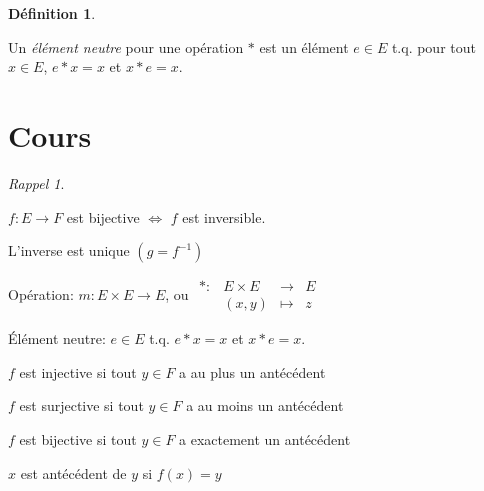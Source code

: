 \documentclass{report}
\newcounter{cours}
\newcommand*{\cours}{\section*{Cours \thecours}\stepcounter{cours}}
\theoremstyle{definition}
\newtheorem*{defin}{D\'efinition}
\theoremstyle{remark}
\newtheorem*{rappel}{Rappel}
\begin{document}
	\begin{defin}~

		Un \emph{\'el\'ement neutre} pour une op\'eration $*$ est un \'el\'ement $e \in E$ t.q. pour tout $x \in E$, $e*x=x$ et $x*e=x$.
	\end{defin}

	\cours
	\begin{rappel}
		~

		\begin{ulist}[noitemsep]
			\item $f:E \to F$ est bijective $\Leftrightarrow$ $f$ est inversible.
			\item L'inverse est unique $(g=f^{-1})$
			\item Op\'eration: $m:E \times E \to E$, ou
			$\begin{array}{rrcl}
				*:&E \times E&\to&E\\
				&(x,y)&\mapsto&z
			\end{array}$
			\item \'El\'ement neutre: $e \in E$ t.q. $e*x=x$ et $x*e=x$.
			\item $f$ est injective si tout $y \in F$ a au plus un ant\'ec\'edent
			\item $f$ est surjective si tout $y \in F$ a au moins un ant\'ec\'edent
			\item $f$ est bijective si tout $y \in F$ a exactement un ant\'ec\'edent
			\item $x$ est ant\'ec\'edent de $y$ si $f(x)=y$
		\end{ulist}
	\end{rappel}
\end{document}
